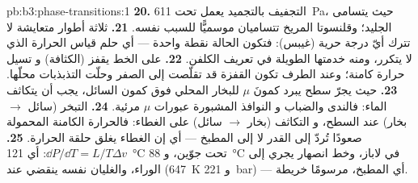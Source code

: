 \begin{solution}{pb:b3:phase-transitions:1}
\textbf{20.} التجفيف بالتجميد يعمل تحت \qty{611}{Pa}، حيث يتسامى
الجليد؛ وقلنسوتا المريخ تتساميان موسميًّا للسبب نفسه.
\textbf{21.} ثلاثة أطوار متعايشة لا تترك أيّ درجة حرية (غيبس):
فتكون الحالة نقطة واحدة --- أي حلم قياس الحرارة الذي لا يتكرر،
ومنه خدمتها الطويلة في تعريف الكلفن.
\textbf{22.} على الخط يقفز  (الكثافة) و
تسيل حرارة كامنة؛ وعند الطرف تكون القفزة قد تقلّصت إلى الصفر
وحلّت التذبذبات محلّها.
\textbf{23.} حيث يجرّ سطح يبرد كمونَ $\mu$ للبخار المحلي
فوق كمون السائل، يجب أن يتكاثف الماء: فالندى والضباب و
النوافذ المشبورة عبورات $\mu$ مرئية.
\textbf{24.} التبخر (سائل $\to$ بخار) عند السطح، و
التكاثف (بخار $\to$ سائل) على الغطاء: فالحرارة الكامنة
المحمولة صعودًا تُردّ إلى القدر لا إلى المطبخ --- أي إن
الغطاء يغلق حلقة الحرارة.
\textbf{25.} $\dd P/\dd T = L/T\Delta v$: أي \qty{121}{\celsius}
تحت جوّين، و \qty{88}{\celsius} في لاباز، وخط انصهار
يجري إلى الوراء، والغليان نفسه ينقضي عند
(\qty{647}{K} و \qty{221}{bar}) --- أي المطبخ، مرسومًا خريطة.
\end{solution}
